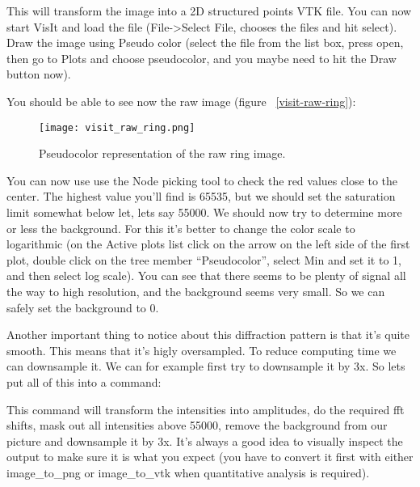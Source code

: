 \documentclass{report}
\begin{document}
This will transform the image into a 2D structured points VTK file.
You can now start VisIt and load the file (File->Select File, chooses the files and hit select).
Draw the image using Pseudo color (select the file from the list box, press open, 
then go to Plots and choose pseudocolor, and you maybe need to hit the Draw button now).


You should be able to see now the raw image (figure ~\ref{visit-raw-ring}):

\begin{figure}[htp]
\centering
\texttt{[image: visit\_raw\_ring.png]}
\caption{Pseudocolor representation of the raw ring image.}
\label{ring-mask}
\end{figure}

You can now use use the Node picking tool to check the red values close to the center. The highest value you'll
find is 65535, but we should set the saturation limit somewhat below let, lets say 55000.
We should now try to determine more or less the background. For this it's better to change the color scale to 
logarithmic (on the Active plots list click on the arrow on the left side of the first plot, double click  on
the tree member ``Pseudocolor'', select Min and set it to 1, and then select log scale).
You can see that there seems to be plenty of signal all the way to high resolution, and the background seems
very small. So we can safely set the background to 0. 


Another important thing to notice about this diffraction pattern is that it's quite smooth. This means that it's
higly oversampled. To reduce computing time we can downsample it. We can for example first try to downsample it by
3x. So lets put all of this into a command:


This command will transform the intensities into amplitudes, do the required fft shifts, mask out all intensities
above 55000, remove the background from our picture and downsample it by 3x.
It's always a good idea to visually inspect the output to make sure it is what you expect (you have to convert it
first with either image\_to\_png or image\_to\_vtk when quantitative analysis is required).
\end{document}
